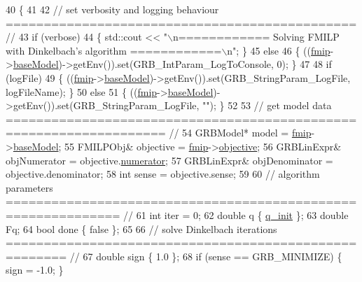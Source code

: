 \begin{DoxyCode}
40  \{
41 
42   \textcolor{comment}{// set verbosity and logging behaviour ============================================== //}
43   \textcolor{keywordflow}{if} (verbose)
44    \{ std::cout << \textcolor{stringliteral}{"\(\backslash\)n============ Solving FMILP with Dinkelbach's algorithm ============\(\backslash\)n"}; \}
45   \textcolor{keywordflow}{else}
46    \{ ((\hyperlink{classgrbfrc_1_1Dinkelbach_aa7b46a3cb24f1ec0f278edaa2348729d}{fmip}->\hyperlink{classgrbfrc_1_1FMILP_a587e886dcaa1ece325a7f283100182a8}{baseModel})->getEnv()).\textcolor{keyword}{set}(GRB\_IntParam\_LogToConsole, 0); \}
47 
48   \textcolor{keywordflow}{if} (logFile)
49    \{ ((\hyperlink{classgrbfrc_1_1Dinkelbach_aa7b46a3cb24f1ec0f278edaa2348729d}{fmip}->\hyperlink{classgrbfrc_1_1FMILP_a587e886dcaa1ece325a7f283100182a8}{baseModel})->getEnv()).\textcolor{keyword}{set}(GRB\_StringParam\_LogFile, logFileName); \}
50   \textcolor{keywordflow}{else}
51    \{ ((\hyperlink{classgrbfrc_1_1Dinkelbach_aa7b46a3cb24f1ec0f278edaa2348729d}{fmip}->\hyperlink{classgrbfrc_1_1FMILP_a587e886dcaa1ece325a7f283100182a8}{baseModel})->getEnv()).\textcolor{keyword}{set}(GRB\_StringParam\_LogFile, \textcolor{stringliteral}{""}); \}
52 
53   \textcolor{comment}{// get model data =================================================================== //}
54   GRBModel* model = \hyperlink{classgrbfrc_1_1Dinkelbach_aa7b46a3cb24f1ec0f278edaa2348729d}{fmip}->\hyperlink{classgrbfrc_1_1FMILP_a587e886dcaa1ece325a7f283100182a8}{baseModel};
55   FMILPObj& objective = \hyperlink{classgrbfrc_1_1Dinkelbach_aa7b46a3cb24f1ec0f278edaa2348729d}{fmip}->\hyperlink{classgrbfrc_1_1FMILP_a8807cc16614684fd6053b44dcd65657c}{objective};
56   GRBLinExpr& objNumerator = objective.\hyperlink{structgrbfrc_1_1FMILPObj_a01c26f8e99a6692909e562aa561c9274}{numerator};
57   GRBLinExpr& objDenominator = objective.denominator;
58   \textcolor{keywordtype}{int} sense = objective.sense;
59 
60   \textcolor{comment}{// algorithm parameters ============================================================= //}
61   \textcolor{keywordtype}{int} iter = 0;
62   \textcolor{keywordtype}{double} q \{ \hyperlink{classgrbfrc_1_1Dinkelbach_aa5ef5cdb3b0b29aee7eeb61c947c2a4d}{q\_init} \};
63   \textcolor{keywordtype}{double} Fq;
64   \textcolor{keywordtype}{bool} done \{ \textcolor{keyword}{false} \};
65 
66   \textcolor{comment}{// solve Dinkelbach iterations ====================================================== //}
67   \textcolor{keywordtype}{double} sign \{ 1.0 \};
68   \textcolor{keywordflow}{if} (sense == GRB\_MINIMIZE) \{ sign = -1.0; \}

\end{DoxyCode}
